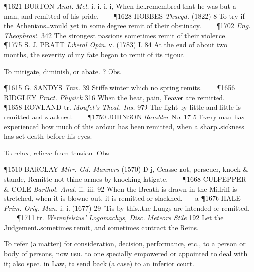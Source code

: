 \begin{description}[wide, labelwidth=!, labelindent=0pt]
\begin{myenumerate}
\P 1621 BURTON  \textit{Anat. Mel.} i. i. i. i, When he‥remembred that he was but a man, and remitted of his pride.    
\P 1628 HOBBES  \textit{Thucyd.} (1822) 8 To try if the Athenians‥would yet in some degree remit of their obstinacy.    
\P 1702  \textit{Eng. Theophrast.} 342 The strongest passions sometimes remit of their violence.    
\P 1775 S. J. PRATT  \textit{Liberal Opin.} v. (1783) I. 84 At the end of about two months, the severity of my fate began to remit of its rigour.

 To mitigate, diminish, or abate. ? Obs.

\P 1615 G. SANDYS  \textit{Trav.} 39 Stiffe winter which no spring remits.    
\P 1656 RIDGLEY  \textit{Pract. Physick} 316 When the heat, pain, Feaver are remitted.    
\P 1658 ROWLAND tr.  \textit{Moufet's Theat. Ins.} 979 The light by little and little is remitted and slackned.    
\P 1750 JOHNSON  \textit{Rambler} No. 17 5 Every man has experienced how much of this ardour has been remitted, when a sharp‥sickness has set death before his eyes.

 To relax, relieve from tension. Obs.

\P 1510 BARCLAY  \textit{Mirr. Gd. Manners} (1570) D j, Ceasse not, perseuer, knock \& stande, Remitte not thine armes by knocking fatigate.    
\P 1668 CULPEPPER \& COLE  \textit{Barthol. Anat.} ii. iii. 92 When the Breath is drawn in the Midriff is stretched, when it is blowne out, it is remitted or slackned.    a 
\P 1676 HALE  \textit{Prim. Orig. Man.} i. i. (1677) 29 'Tis by this‥the Lungs are intended or remitted.    
\P 1711 tr.  \textit{Werenfelsius' Logomachys, Disc. Meteors Stile} 192 Let the Judgement‥sometimes remit, and sometimes contract the Reins.

 To refer (a matter) for consideration, decision, performance, etc., to a person or body of persons, now usu. to one specially empowered or appointed to deal with it; also spec. in Law, to send back (a case) to an inferior court.


\end{myenumerate}
\end{description}
